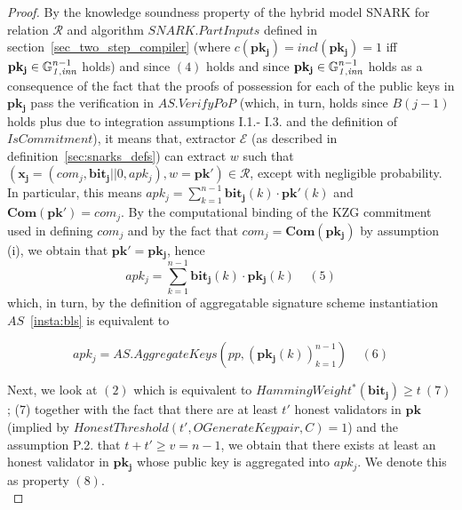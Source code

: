 \begin{proof}
\noindent By the knowledge soundness property of the hybrid model SNARK for relation $\mathcal{R}$ and 
algorithm $\mathit{SNARK.PartInputs}$ defined in section~\ref{sec_two_step_compiler} 
(where $c(\mathbf{pk_j}) = \mathit{incl}(\mathbf{pk_j}) =1$ 
iff $\mathbf{pk_j} \in \mathbb{G}_{\mathit{1,inn}}^{n-1}$ holds) and since $(4)$ holds and since $\mathbf{pk_j} \in \mathbb{G}_{\mathit{1,inn}}^{n-1}$ holds 
as a consequence of the fact that the proofs of possession for each of the public
keys in $\mathbf{pk_j}$ pass the verification in $\mathit{AS.VerifyPoP}$ (which, in turn, holds since 
$B(j-1)$ holds plus due to integration assumptions I.1.- I.3. and the definition of $\mathit{IsCommitment}$), 
it means that, extractor $\mathcal{E}$ (as described in definition~\ref{sec:snarks_defs}) can extract 
$w$ such that $(\mathbf{x_j} = (\mathit{com_j},\mathbf{bit_j}||0,\mathit{apk_j}), w = \mathbf{pk'}) \in \mathcal{R}$, 
except with negligible probability. In particular, this means $\mathit{apk_j} = \sum_{k=1}^{n-1} \mathbf{bit_j}(k) \cdot \mathbf{pk'}(k)$ and 
$\mathbf{Com}(\mathbf{pk'}) = \mathit{com_j}$. By the computational binding of the KZG commitment used in defining $\mathit{com_j}$ 
and by the fact that  $\mathit{com_j} = \mathbf{Com}(\mathbf{pk_j})$ by assumption (i), we obtain that $\mathbf{pk'} = \mathbf{pk_j}$, 
hence
$$\mathit{apk_j} = \sum_{k=1}^{n-1} \mathbf{bit_j}(k) \cdot \mathbf{pk_j}(k) \ \ \ \ \ (5)$$ 
which, in turn, by the definition of aggregatable signature scheme instantiation $\mathit{AS}$~\ref{insta:bls} 
is equivalent to 

$$\mathit{apk_j} = \mathit{AS.AggregateKeys}(\mathit{pp}, (\mathbf{pk_j}(k))_{k=1}^{n-1}) \ \ \ \ \ (6)$$ 

\noindent Next, we look at $(2)$ which is equivalent to $\mathit{HammingWeight^*}(\mathbf{bit_j}) \geq t \ (7)$; (7)  
together with the fact that there are at least $t'$ honest validators in 
$\mathbf{pk}$ (implied by $\mathit{HonestThreshold}(t', \mathit{OGenerateKeypair}, C) = 1$) and the assumption P.2. that 
$t+t' \geq v=n-1$, we obtain that there exists at least an honest validator in $\mathbf{pk_j}$ 
whose public key is aggregated into $\mathit{apk_j}$. We denote this as property $(8)$. \\


\end{proof}
